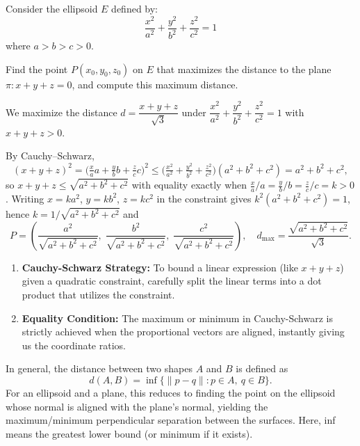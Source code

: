 
\begin{problem}
Consider the ellipsoid $E$ defined by:
\[ \frac{x^2}{a^2} + \frac{y^2}{b^2} + \frac{z^2}{c^2} = 1 \]
where $a > b > c > 0$.

Find the point $P(x_0, y_0, z_0)$ on $E$ that maximizes the distance to the plane $\pi: x + y + z = 0$, and compute this maximum distance.
\end{problem}

\begin{solution}
We maximize the distance $d=\dfrac{x+y+z}{\sqrt{3}}$ under $\dfrac{x^2}{a^2}+\dfrac{y^2}{b^2}+\dfrac{z^2}{c^2}=1$ with $x+y+z>0$.

By Cauchy--Schwarz,
\[
    (x+y+z)^2 = \bigg(\tfrac{x}{a}a+\tfrac{y}{b}b+\tfrac{z}{c}c\bigg)^2
    \le \Big(\tfrac{x^2}{a^2}+\tfrac{y^2}{b^2}+\tfrac{z^2}{c^2}\Big)(a^2+b^2+c^2)
    = a^2+b^2+c^2,
\]
so $x+y+z \le \sqrt{a^2+b^2+c^2}$ with equality exactly when $\tfrac{x}{a}/a = \tfrac{y}{b}/b = \tfrac{z}{c}/c = k > 0$. Writing $x=ka^2$, $y=kb^2$, $z=kc^2$ in the constraint gives $k^2(a^2+b^2+c^2)=1$, hence $k=1/\sqrt{a^2+b^2+c^2}$ and
\[
    P=\left( \frac{a^2}{\sqrt{a^2+b^2+c^2}},\; \frac{b^2}{\sqrt{a^2+b^2+c^2}},\; \frac{c^2}{\sqrt{a^2+b^2+c^2}} \right),
    \quad d_{\max}=\frac{\sqrt{a^2+b^2+c^2}}{\sqrt{3}}.
\]
\end{solution}

\begin{takeaways}
\begin{enumerate}
    \item \textbf{Cauchy-Schwarz Strategy:} To bound a linear expression (like $x+y+z$) given a quadratic constraint, carefully split the linear terms into a dot product that utilizes the constraint.
    \item \textbf{Equality Condition:} The maximum or minimum in Cauchy-Schwarz is strictly achieved when the proportional vectors are aligned, instantly giving us the coordinate ratios.
\end{enumerate}
\end{takeaways}

\begin{remark}
In general, the distance between two shapes $A$ and $B$ is defined as
\[ d(A,B) = \inf\{\|p-q\| : p\in A,\ q\in B\}. \]
For an ellipsoid and a plane, this reduces to finding the point on the ellipsoid whose normal is aligned with the plane's normal, yielding the maximum/minimum perpendicular separation between the surfaces.
Here, inf means the greatest lower bound (or minimum if it exists).

\end{remark}

